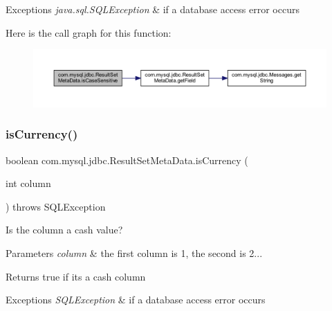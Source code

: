 \begin{DoxyExceptions}{Exceptions}
{\em java.\+sql.\+S\+Q\+L\+Exception} & if a database access error occurs \\
\hline
\end{DoxyExceptions}
Here is the call graph for this function\+:
\nopagebreak
\begin{figure}[H]
\begin{center}
\leavevmode
\includegraphics[width=350pt]{classcom_1_1mysql_1_1jdbc_1_1_result_set_meta_data_a34d591e0699ad43b0ce73806856460d0_cgraph}
\end{center}
\end{figure}
\mbox{\label{classcom_1_1mysql_1_1jdbc_1_1_result_set_meta_data_a4d62a9100c2c29bd364a8ded3f3f68d1}} 
\subsubsection{\texorpdfstring{is\+Currency()}{isCurrency()}}
{\footnotesize\ttfamily boolean com.\+mysql.\+jdbc.\+Result\+Set\+Meta\+Data.\+is\+Currency (\begin{DoxyParamCaption}\item[{int}]{column }\end{DoxyParamCaption}) throws S\+Q\+L\+Exception}

Is the column a cash value?


\begin{DoxyParams}{Parameters}
{\em column} & the first column is 1, the second is 2...\\
\hline
\end{DoxyParams}
\begin{DoxyReturn}{Returns}
true if its a cash column
\end{DoxyReturn}

\begin{DoxyExceptions}{Exceptions}
{\em S\+Q\+L\+Exception} & if a database access error occurs \\
\hline
\end{DoxyExceptions}
\mbox{\label{classcom_1_1mysql_1_1jdbc_1_1_result_set_meta_data_a5b118f6ee07908b8ba7983948bea557f}} 
